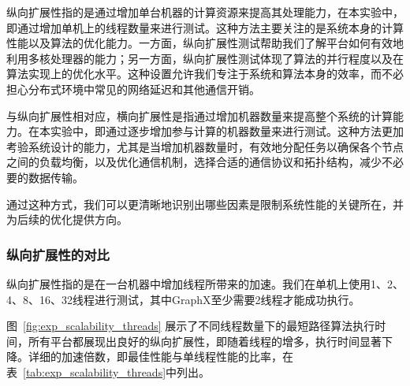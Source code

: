 纵向扩展性指的是通过增加单台机器的计算资源来提高其处理能力，在本实验中，即通过增加单机上的线程数量来进行测试。这种方法主要关注的是系统本身的计算性能以及算法的优化能力。一方面，纵向扩展性测试帮助我们了解平台如何有效地利用多核处理器的能力；另一方面，纵向扩展性测试体现了算法的并行程度以及在算法实现上的优化水平。这种设置允许我们专注于系统和算法本身的效率，而不必担心分布式环境中常见的网络延迟和其他通信开销。

与纵向扩展性相对应，横向扩展性是指通过增加机器数量来提高整个系统的计算能力。在本实验中，即通过逐步增加参与计算的机器数量来进行测试。这种方法更加考验系统设计的能力，尤其是当增加机器数量时，有效地分配任务以确保各个节点之间的负载均衡，以及优化通信机制，选择合适的通信协议和拓扑结构，减少不必要的数据传输。

通过这种方式，我们可以更清晰地识别出哪些因素是限制系统性能的关键所在，并为后续的优化提供方向。

\subsubsection{纵向扩展性的对比}

纵向扩展性指的是在一台机器中增加线程所带来的加速。我们在单机上使用1、2、4、8、16、32线程进行测试，其中GraphX至少需要2线程才能成功执行。

图~\ref{fig:exp_scalability_threads} 展示了不同线程数量下的最短路径算法执行时间，所有平台都展现出良好的纵向扩展性，即随着线程的增多，执行时间显著下降。详细的加速倍数，即最佳性能与单线程性能的比率，在表~\ref{tab:exp_scalability_threads}中列出。

\begin{table}[h]\centering
    \def\arraystretch{1.5}
    \caption{纵向扩展性加速倍数}
    \label{tab:exp_scalability_threads}
    \tiny
\end{table}

